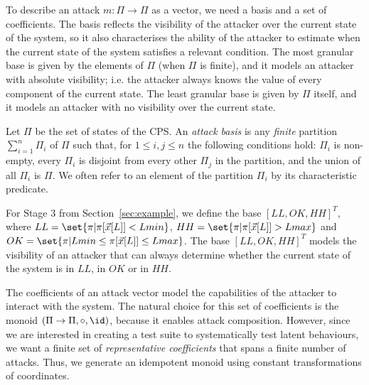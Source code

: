 {%
To describe an attack $m\colon \Pi\rightarrow \Pi$ as a vector, we need a basis and a set of coefficients. The basis reflects the visibility of the attacker over the current state of the system, so it also characterises the ability of the attacker to estimate when the current state of the system satisfies a relevant condition. The most granular base is given by the elements of $\Pi$ (when $\Pi$ is finite), and it models an attacker with absolute visibility; i.e. the attacker always knows the value of every component of the current state. The least granular base is given by $\Pi$ itself, and it models an attacker with no visibility over the current state.
\begin{definition}
  \label{def:AttackBasis}
Let $\Pi$ be the set of states of the CPS. An \emph{attack basis} is any \emph{finite} partition $\sum_{i=1}^n \Pi_i$ of $\Pi$ such that, for $1\leq i,j \leq n$ the following conditions hold: $\Pi_i$ is non-empty, every $\Pi_i$ is disjoint from every other $\Pi_j$ in the partition, and the union of all $\Pi_i$ is $\Pi$. We often refer to an element of the partition $\Pi_i$ by its characteristic predicate.
\end{definition}
\begin{example}
  \label{ex:AttackBasis}
  For Stage 3 from Section~\ref{sec:example}, we define the base $[LL, OK, HH]^T$, where ${LL}=\set{\pi| \pi[\vec{x}[L]]<Lmin}$, ${HH}=\set{\pi| \pi[\vec{x}[L]]>Lmax}$ and ${OK}=\set{\pi|Lmin \leq \pi[\vec{x}[L]]\leq Lmax}$. The base $[LL, OK, HH]^T$ models the visibility of an attacker that can always determine whether the current state of the system is in $LL$, in $OK$ or in $HH$.  %
\end{example}

The coefficients of an attack vector model the capabilities of the attacker to interact with the system. The natural choice for this set of coefficients is the monoid $(\Pi\rightarrow \Pi, \circ, \id)$, because it enables attack composition. However, since we are interested in creating a test suite to systematically test latent behaviours, we want a finite set of \emph{representative coefficients} that spans a finite number of attacks. Thus, we generate an {idempotent monoid} using constant transformations of coordinates.%

}
